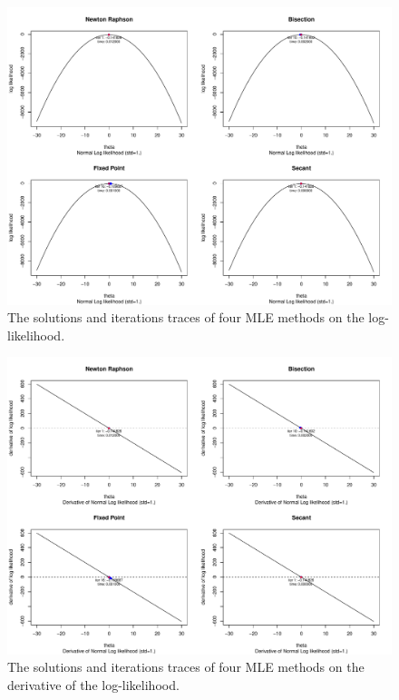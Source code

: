 \begin{figure}[h!]
\includegraphics[scale=0.3]{figs/normal-sol-on-loglik-4figs.pdf}
\caption{The solutions and iterations traces of four MLE methods on the log-likelihood.}
\label{img:normal-sol-on-loglik-4figs}
\end{figure}

\begin{figure}[h!]
\includegraphics[scale=0.3]{figs/normal-sol-on-deriv-4figs.pdf}
\caption{The solutions and iterations traces of four MLE methods on the derivative of the log-likelihood.}
\label{img:normal-sol-on-deriv-4figs}
\end{figure}

